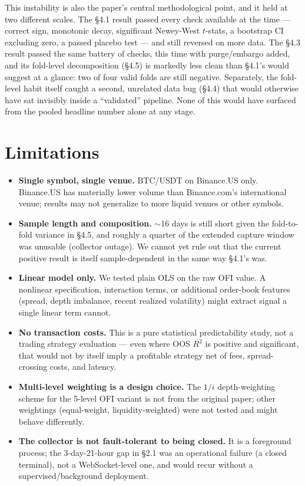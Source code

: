 \documentclass[11pt]{article}
\begin{document}
This instability is also the paper's central methodological point, and it held at two different scales. The \S4.1 result passed every check available at the time --- correct sign, monotonic decay, significant Newey-West $t$-stats, a bootstrap CI excluding zero, a passed placebo test --- and still reversed on more data. The \S4.3 result passed the same battery of checks, this time with purge/embargo added, and its fold-level decomposition (\S4.5) is markedly less clean than \S4.1's would suggest at a glance: two of four valid folds are still negative. Separately, the fold-level habit itself caught a second, unrelated data bug (\S4.4) that would otherwise have sat invisibly inside a ``validated'' pipeline. None of this would have surfaced from the pooled headline number alone at any stage.

\section{Limitations}

\begin{itemize}
\item \textbf{Single symbol, single venue.} BTC/USDT on Binance.US only. Binance.US has materially lower volume than Binance.com's international venue; results may not generalize to more liquid venues or other symbols.
\item \textbf{Sample length and composition.} $\sim$16 days is still short given the fold-to-fold variance in \S4.5, and roughly a quarter of the extended capture window was unusable (collector outage). We cannot yet rule out that the current positive result is itself sample-dependent in the same way \S4.1's was.
\item \textbf{Linear model only.} We tested plain OLS on the raw OFI value. A nonlinear specification, interaction terms, or additional order-book features (spread, depth imbalance, recent realized volatility) might extract signal a single linear term cannot.
\item \textbf{No transaction costs.} This is a pure statistical predictability study, not a trading strategy evaluation --- even where OOS $R^2$ is positive and significant, that would not by itself imply a profitable strategy net of fees, spread-crossing costs, and latency.
\item \textbf{Multi-level weighting is a design choice.} The $1/i$ depth-weighting scheme for the 5-level OFI variant is not from the original paper; other weightings (equal-weight, liquidity-weighted) were not tested and might behave differently.
\item \textbf{The collector is not fault-tolerant to being closed.} It is a foreground process; the 3-day-21-hour gap in \S2.1 was an operational failure (a closed terminal), not a WebSocket-level one, and would recur without a supervised/background deployment.
\end{itemize}
\end{document}
